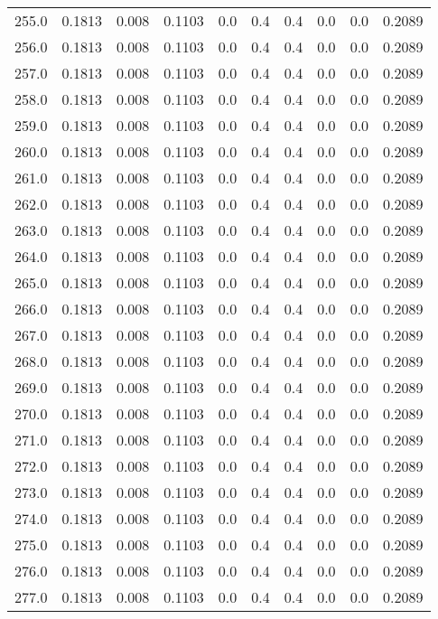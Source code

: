 \begin{longtable}{lrrrrrrrrr}
255.0 & 0.1813 & 0.008 & 0.1103 & 0.0 & 0.4 & 0.4 & 0.0 & 0.0 & 0.2089 \\
256.0 & 0.1813 & 0.008 & 0.1103 & 0.0 & 0.4 & 0.4 & 0.0 & 0.0 & 0.2089 \\
257.0 & 0.1813 & 0.008 & 0.1103 & 0.0 & 0.4 & 0.4 & 0.0 & 0.0 & 0.2089 \\
258.0 & 0.1813 & 0.008 & 0.1103 & 0.0 & 0.4 & 0.4 & 0.0 & 0.0 & 0.2089 \\
259.0 & 0.1813 & 0.008 & 0.1103 & 0.0 & 0.4 & 0.4 & 0.0 & 0.0 & 0.2089 \\
260.0 & 0.1813 & 0.008 & 0.1103 & 0.0 & 0.4 & 0.4 & 0.0 & 0.0 & 0.2089 \\
261.0 & 0.1813 & 0.008 & 0.1103 & 0.0 & 0.4 & 0.4 & 0.0 & 0.0 & 0.2089 \\
262.0 & 0.1813 & 0.008 & 0.1103 & 0.0 & 0.4 & 0.4 & 0.0 & 0.0 & 0.2089 \\
263.0 & 0.1813 & 0.008 & 0.1103 & 0.0 & 0.4 & 0.4 & 0.0 & 0.0 & 0.2089 \\
264.0 & 0.1813 & 0.008 & 0.1103 & 0.0 & 0.4 & 0.4 & 0.0 & 0.0 & 0.2089 \\
265.0 & 0.1813 & 0.008 & 0.1103 & 0.0 & 0.4 & 0.4 & 0.0 & 0.0 & 0.2089 \\
266.0 & 0.1813 & 0.008 & 0.1103 & 0.0 & 0.4 & 0.4 & 0.0 & 0.0 & 0.2089 \\
267.0 & 0.1813 & 0.008 & 0.1103 & 0.0 & 0.4 & 0.4 & 0.0 & 0.0 & 0.2089 \\
268.0 & 0.1813 & 0.008 & 0.1103 & 0.0 & 0.4 & 0.4 & 0.0 & 0.0 & 0.2089 \\
269.0 & 0.1813 & 0.008 & 0.1103 & 0.0 & 0.4 & 0.4 & 0.0 & 0.0 & 0.2089 \\
270.0 & 0.1813 & 0.008 & 0.1103 & 0.0 & 0.4 & 0.4 & 0.0 & 0.0 & 0.2089 \\
271.0 & 0.1813 & 0.008 & 0.1103 & 0.0 & 0.4 & 0.4 & 0.0 & 0.0 & 0.2089 \\
272.0 & 0.1813 & 0.008 & 0.1103 & 0.0 & 0.4 & 0.4 & 0.0 & 0.0 & 0.2089 \\
273.0 & 0.1813 & 0.008 & 0.1103 & 0.0 & 0.4 & 0.4 & 0.0 & 0.0 & 0.2089 \\
274.0 & 0.1813 & 0.008 & 0.1103 & 0.0 & 0.4 & 0.4 & 0.0 & 0.0 & 0.2089 \\
275.0 & 0.1813 & 0.008 & 0.1103 & 0.0 & 0.4 & 0.4 & 0.0 & 0.0 & 0.2089 \\
276.0 & 0.1813 & 0.008 & 0.1103 & 0.0 & 0.4 & 0.4 & 0.0 & 0.0 & 0.2089 \\
277.0 & 0.1813 & 0.008 & 0.1103 & 0.0 & 0.4 & 0.4 & 0.0 & 0.0 & 0.2089 \\

\end{longtable}

